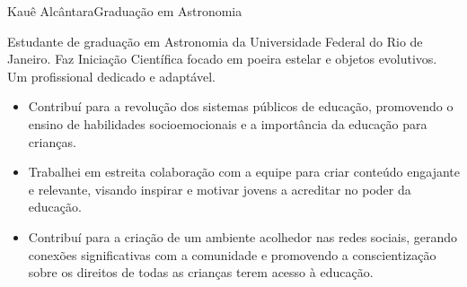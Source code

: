 \documentclass{article}
\begin{document}
\begin{cv}[fotocv]{Kauê Alcântara}{Graduação em Astronomia}


Estudante de graduação em Astronomia da Universidade Federal do Rio de Janeiro. Faz Iniciação Científica focado em poeira estelar e objetos evolutivos. 
Um profissional dedicado e adaptável.


\begin{cvevent}[2023][2020]
    \begin{itemize}
        \item Contribuí para a revolução dos sistemas públicos de educação, promovendo o ensino de habilidades socioemocionais e a importância da educação para crianças.
        \item Trabalhei em estreita colaboração com a equipe para criar conteúdo engajante e relevante, visando inspirar e motivar jovens a acreditar no poder da educação.
        \item Contribuí para a criação de um ambiente acolhedor nas redes sociais, gerando conexões significativas com a comunidade e promovendo a conscientização sobre os direitos de todas as crianças terem acesso à educação.
    \end{itemize}
\end{cvevent}

\begin{cvevent}[2020]
\end{cvevent}



\begin{cvevent}[presente][2022]
\end{cvevent}

\vspace{15pt}

\begin{cvevent}[2021][2020]
\end{cvevent}


\end{cv}
\end{document}
